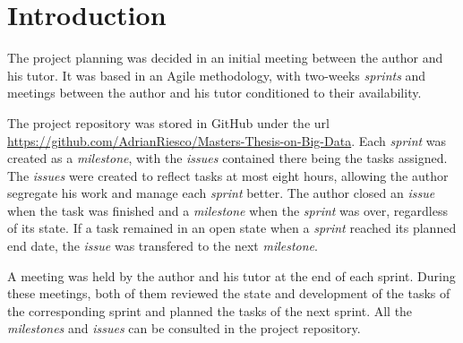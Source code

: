 
\section{Introduction}
\nonzeroparskip The project planning was decided in an initial meeting between the author and his tutor. It was based in an Agile methodology, with two-weeks \textit{sprints} and meetings between the author and his tutor conditioned to their availability.

\nonzeroparskip The project repository was stored in GitHub under the url \url{https://github.com/AdrianRiesco/Masters-Thesis-on-Big-Data}. Each \textit{sprint} was created as a \textit{milestone}, with the \textit{issues} contained there being the tasks assigned. The \textit{issues} were created to reflect tasks at most eight hours, allowing the author segregate his work and manage each \textit{sprint} better. The author closed an \textit{issue} when the task was finished and a \textit{milestone} when the \textit{sprint} was over, regardless of its state. If a task remained in an open state when a \textit{sprint} reached its planned end date, the \textit{issue} was transfered to the next \textit{milestone}.

\nonzeroparskip A meeting was held by the author and his tutor at the end of each sprint. During these meetings, both of them reviewed the state and development of the tasks of the corresponding sprint and planned the tasks of the next sprint. All the \textit{milestones} and \textit{issues} can be consulted in the project repository.

